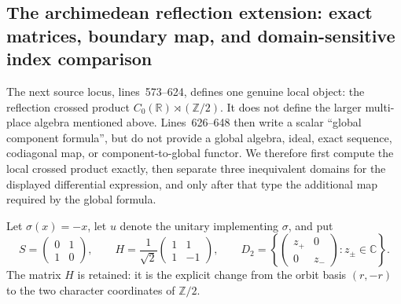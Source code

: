 \subsection{The archimedean reflection extension: exact matrices, boundary
map, and domain-sensitive index comparison}

The next source locus, lines~573--624, defines one genuine local object:
the reflection crossed product $C_0(\mathbb R)\rtimes(\mathbb Z/2)$.  It does
not define the larger multi-place algebra mentioned above.  Lines~626--648
then write a scalar ``global component formula'', but do not provide a global
algebra, ideal, exact sequence, codiagonal map, or component-to-global
functor.  We therefore first compute the local crossed product exactly, then
separate three inequivalent domains for the displayed differential
expression, and only after that type the additional map required by the
global formula.

Let $\sigma(x)=-x$, let $u$ denote the unitary implementing $\sigma$, and put
\[
 S=\begin{pmatrix}0&1\\1&0\end{pmatrix},\qquad
 H=\frac1{\sqrt2}\begin{pmatrix}1&1\\1&-1\end{pmatrix},\qquad
 D_2=\left\{\begin{pmatrix}z_+&0\\0&z_-\end{pmatrix}:z_\pm\in\mathbb C\right\}.
\]
The matrix $H$ is retained: it is the explicit change from the orbit basis
$(r,-r)$ to the two character coordinates of $\mathbb Z/2$.

